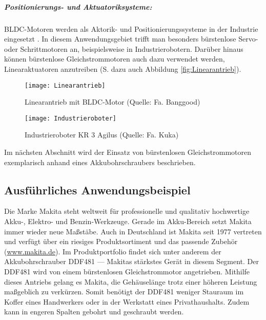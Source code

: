 \subparagraph{Positionierungs- und Aktuatoriksysteme:} BLDC-Motoren werden als Aktorik- und Positionierungssysteme in der Industrie eingesetzt \parencite[S. 159]{Gopal2002}. In diesem Anwendungsgebiet trifft man besonders bürstenlose Servo- oder Schrittmotoren an, beispielsweise in Industrierobotern. Darüber hinaus können bürstenlose Gleichstrommotoren auch dazu verwendet werden, Linearaktuatoren anzutreiben \parencite[S. 91]{Zhang2013} (S.  dazu auch Abbildung \ref{fig:Linearantrieb}).

\begin{figure}[H]
  \begin{minipage}{.47\textwidth}
    \centering
    \texttt{[image: Linearantrieb]}
    \caption[Linearantrieb mit BLDC-Motor]{Linearantrieb mit BLDC-Motor (Quelle: Fa. Banggood)}
    \label{fig:Linearantrieb}
  \end{minipage}\hfill%
  \begin{minipage}{.47\textwidth}
    \centering
    \texttt{[image: Industrieroboter]}
    \caption[Industrieroboter KR 3 Agilus]{Industrieroboter KR 3 Agilus (Quelle: Fa. Kuka)}
    \label{fig:Industrieroboter}
  \end{minipage}
\end{figure}

Im nächsten Abschnitt wird der Einsatz von bürstenlosen Gleichstrommotoren exemplarisch anhand eines Akkubohrschraubers beschrieben.

\subsection{Ausführliches Anwendungsbeispiel}

\glqq{}Die Marke Makita steht weltweit für professionelle und qualitativ hochwertige Akku-, Elektro- und Benzin-Werkzeuge. Gerade im Akku-Bereich setzt Makita immer wieder neue Maßstäbe. Auch in Deutschland ist Makita seit 1977 vertreten und verfügt über ein riesiges Produktsortiment und das passende Zubehör\grqq{} (\url{www.makita.de}). Im Produktportfolio findet sich unter anderem der Akkubohrschrauber DDF481 --- Makitas stärkstes Gerät in diesem Segment. Der DDF481 wird von einem bürstenlosen Gleichstrommotor angetrieben. Mithilfe dieses Antriebs gelang es Makita, die Gehäuselänge trotz einer höheren Leistung maßgeblich zu verkürzen. Somit benötigt der DDF481 weniger Stauraum im Koffer eines Handwerkers oder in der Werkstatt eines Privathaushalts. Zudem kann in engeren Spalten gebohrt und geschraubt werden.

